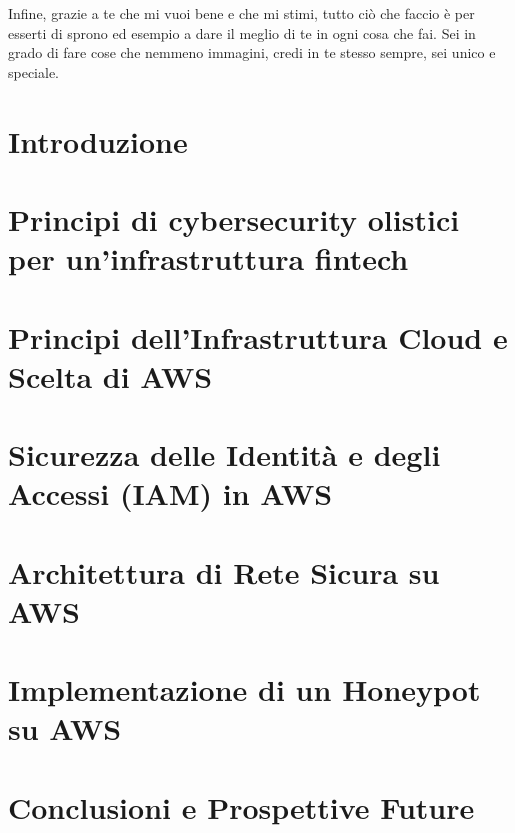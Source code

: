 \documentclass[a4paper,12pt]{report}
\begin{document}
\bigskip
Infine, grazie a te che mi vuoi bene e che mi stimi, tutto ciò che faccio è per esserti di sprono ed esempio a dare il meglio di te in ogni cosa che fai. Sei in grado di fare cose che nemmeno immagini, credi in te stesso sempre, sei unico e speciale.
\setcounter{tocdepth}{2} %
\tableofcontents
\listoffigures %
\cleardoublepage
{}
\chapter{Introduzione}
\label{chapter:introduzione}


\chapter{Principi di cybersecurity olistici \allowbreak{} per un'infrastruttura fintech}
\label{ch:principi-cybersecurity}


\chapter{Principi dell'Infrastruttura Cloud e Scelta di AWS}
\label{ch:cloud-aws}

\chapter{Sicurezza delle Identità e degli Accessi (IAM) in AWS}
\label{ch:iam_security}

\chapter{Architettura di Rete Sicura su AWS}
\label{ch:vpc_infra_security}

\chapter{Implementazione di un Honeypot su AWS}
\label{ch:honeypot}

\chapter{Conclusioni e Prospettive Future}
\label{chap:conclusioni}

%
\printbibliography
% 
\end{document}
